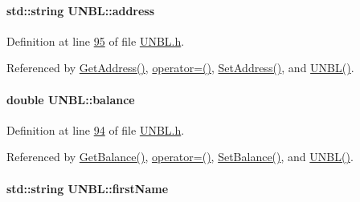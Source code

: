 \paragraph[{\texorpdfstring{address}{address}}]{\setlength{\rightskip}{0pt plus 5cm}std\+::string U\+N\+B\+L\+::address\hspace{0.3cm}{\ttfamily [private]}}\hypertarget{class_u_n_b_l_acdaf39211e9b9c190a69bbbc590543e3_acdaf39211e9b9c190a69bbbc590543e3}{}\label{class_u_n_b_l_acdaf39211e9b9c190a69bbbc590543e3_acdaf39211e9b9c190a69bbbc590543e3}


Definition at line \hyperlink{_u_n_b_l_8h_source_l00095}{95} of file \hyperlink{_u_n_b_l_8h_source}{U\+N\+B\+L.\+h}.



Referenced by \hyperlink{_u_n_b_l_8cpp_source_l00059}{Get\+Address()}, \hyperlink{_u_n_b_l_8h_source_l00060}{operator=()}, \hyperlink{_u_n_b_l_8cpp_source_l00055}{Set\+Address()}, and \hyperlink{_u_n_b_l_8h_source_l00022}{U\+N\+B\+L()}.

\paragraph[{\texorpdfstring{balance}{balance}}]{\setlength{\rightskip}{0pt plus 5cm}double U\+N\+B\+L\+::balance\hspace{0.3cm}{\ttfamily [private]}}\hypertarget{class_u_n_b_l_afbe674996d7fddaffb55654e6a79f03b_afbe674996d7fddaffb55654e6a79f03b}{}\label{class_u_n_b_l_afbe674996d7fddaffb55654e6a79f03b_afbe674996d7fddaffb55654e6a79f03b}


Definition at line \hyperlink{_u_n_b_l_8h_source_l00094}{94} of file \hyperlink{_u_n_b_l_8h_source}{U\+N\+B\+L.\+h}.



Referenced by \hyperlink{_u_n_b_l_8cpp_source_l00067}{Get\+Balance()}, \hyperlink{_u_n_b_l_8h_source_l00060}{operator=()}, \hyperlink{_u_n_b_l_8cpp_source_l00063}{Set\+Balance()}, and \hyperlink{_u_n_b_l_8h_source_l00022}{U\+N\+B\+L()}.

\paragraph[{\texorpdfstring{first\+Name}{firstName}}]{\setlength{\rightskip}{0pt plus 5cm}std\+::string U\+N\+B\+L\+::first\+Name\hspace{0.3cm}{\ttfamily [private]}}\hypertarget{class_u_n_b_l_acee1595bf1914ac220f7c810b174bd16_acee1595bf1914ac220f7c810b174bd16}{}\label{class_u_n_b_l_acee1595bf1914ac220f7c810b174bd16_acee1595bf1914ac220f7c810b174bd16}


